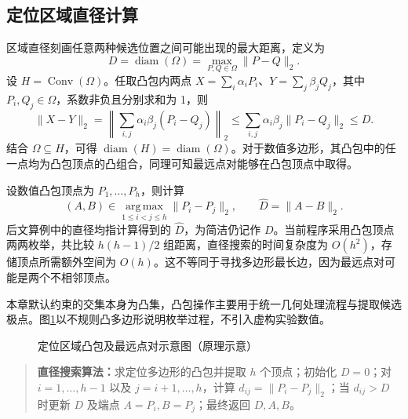 \subsection{定位区域直径计算}
区域直径刻画任意两种候选位置之间可能出现的最大距离，定义为
\begin{equation}
 D=\operatorname{diam}(\Omega)=\max_{P,Q\in\Omega}\|P-Q\|_2.
\end{equation}
设 $H=\operatorname{Conv}(\Omega)$。任取凸包内两点 $X=\sum_i\alpha_iP_i$、$Y=\sum_j\beta_jQ_j$，其中 $P_i,Q_j\in\Omega$，系数非负且分别求和为 1，则
\begin{equation}
 \|X-Y\|_2=\left\|\sum_{i,j}\alpha_i\beta_j(P_i-Q_j)\right\|_2
 \leq\sum_{i,j}\alpha_i\beta_j\|P_i-Q_j\|_2\leq D.
\end{equation}
结合 $\Omega\subseteq H$，可得 $\operatorname{diam}(H)=\operatorname{diam}(\Omega)$。对于数值多边形，其凸包中的任一点均为凸包顶点的凸组合，同理可知最远点对能够在凸包顶点中取得。

设数值凸包顶点为 $P_1,\ldots,P_h$，则计算
\begin{equation}
 (A,B)\in\operatorname*{arg\,max}_{1\leq i<j\leq h}\|P_i-P_j\|_2,\qquad
 \widehat D=\|A-B\|_2.
\end{equation}
后文算例中的直径均指计算得到的 $\widehat D$，为简洁仍记作 $D$。当前程序采用凸包顶点两两枚举，共比较 $h(h-1)/2$ 组距离，直径搜索的时间复杂度为 $O(h^2)$，存储顶点所需额外空间为 $O(h)$。这不等同于寻找多边形最长边，因为最远点对可能是两个不相邻顶点。

本章默认约束的交集本身为凸集，凸包操作主要用于统一几何处理流程与提取候选极点。图\ref{fig:hull}以不规则凸多边形说明枚举过程，不引入虚构实验数值。
\begin{figure}[htbp]\centering
\caption{定位区域凸包及最远点对示意图（原理示意）}\label{fig:hull}\end{figure}
\begin{quote}\small
\textbf{直径搜索算法：}求定位多边形的凸包并提取 $h$ 个顶点；初始化 $D=0$；对 $i=1,\ldots,h-1$ 以及 $j=i+1,\ldots,h$，计算 $d_{ij}=\|P_i-P_j\|_2$；当 $d_{ij}>D$ 时更新 $D$ 及端点 $A=P_i,B=P_j$；最终返回 $D,A,B$。
\end{quote}

